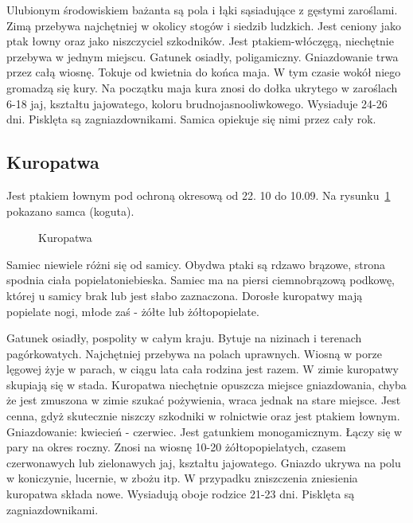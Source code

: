 \documentclass[a4paper,12pt]{article}
\begin{document}
Ulubionym środowiskiem bażanta są pola i łąki sąsiadujące z gęstymi zaroślami. Zimą przebywa najchętniej w okolicy stogów i siedzib ludzkich. Jest ceniony jako ptak łowny oraz jako niszczyciel szkodników. Jest ptakiem-włóczęgą, niechętnie przebywa w jednym miejscu. Gatunek osiadły, poligamiczny. Gniazdowanie trwa przez całą wiosnę. Tokuje od kwietnia do końca maja. W tym czasie wokół niego gromadzą się kury. Na początku maja kura znosi do dołka ukrytego w zaroślach 6-18 jaj, kształtu jajowatego, koloru brudnojasnooliwkowego. Wysiaduje 24-26 dni. Pisklęta są zagniazdownikami. Samica opiekuje się nimi przez cały rok. 


\subsection{Kuropatwa}

Jest ptakiem łownym pod ochroną okresową od 22. 10 do 10.09.
Na rysunku~\ref{fig:kuropatwa} pokazano samca (koguta). 

\begin{figure}
\caption{Kuropatwa}
\label{fig:kuropatwa}
\end{figure}

Samiec niewiele różni się od samicy. Obydwa ptaki są rdzawo brązowe, strona spodnia ciała popielatoniebieska. Samiec ma na piersi ciemnobrązową podkowę, której u samicy brak lub jest słabo zaznaczona. Dorosłe kuropatwy mają popielate nogi, młode zaś - żółte lub żółtopopielate.

Gatunek osiadły, pospolity w całym kraju. Bytuje na nizinach i terenach pagórkowatych. Najchętniej przebywa na polach uprawnych. Wiosną w porze lęgowej żyje w parach, w ciągu lata cała rodzina jest razem. W zimie kuropatwy skupiają się w stada. Kuropatwa niechętnie opuszcza miejsce gniazdowania, chyba że jest zmuszona w zimie szukać pożywienia, wraca jednak na stare miejsce. Jest cenna, gdyż skutecznie niszczy szkodniki w rolnictwie oraz jest ptakiem łownym. Gniazdowanie: kwiecień - czerwiec. Jest gatunkiem monogamicznym. Łączy się w pary na okres roczny. Znosi na wiosnę 10-20 żółtopopielatych, czasem czerwonawych lub zielonawych jaj, kształtu jajowatego. Gniazdo ukrywa na polu w koniczynie, lucernie, w zbożu itp. W przypadku zniszczenia zniesienia kuropatwa składa nowe. Wysiadują oboje rodzice 21-23 dni. Pisklęta są zagniazdownikami. 
\end{document}
